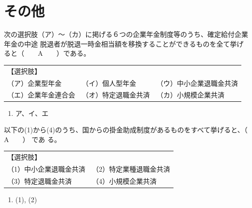 \section{その他}

\begin{fillblank}[年金1 2020 問題1(6)\textcircled{4}]
  次の選択肢（ア）～（カ）に掲げる６つの企業年金制度等のうち、確定給付企業年金の中途
脱退者が脱退一時金相当額を移換することができるものを全て挙げると（　　A　　）である。

\begin{table}[htbp]
  \centering
  \begin{tabular}{|lll|} \hline
    【選択肢】 & & \\ 
    （ア）企業型年金 & （イ）個人型年金 & （ウ）中小企業退職金共済 \\ 
    （エ）企業年金連合会 & （オ）特定退職金共済 & （カ）小規模企業共済 \\ \hline
  \end{tabular}
\end{table}
\end{fillblank}

\begin{answerbox}
  \begin{enumerate}[A: ]
    \item ア、イ、エ
  \end{enumerate}
\end{answerbox}

\begin{fillblank}[年金1 2024 問題1(6)エ]
  以下の(1)から(4)のうち、国からの掛金助成制度があるものをすべて挙げると、（　　A　　） であ
る。

\begin{table}[htbp]
  \centering
  \begin{tabular}{|ll|} \hline
    【選択肢】 &  \\ 
    （1）中小企業退職金共済 & （2）特定業種退職金共済  \\ 
    （3）特定退職金共済 & （4）小規模企業共済 \\ \hline
  \end{tabular}
\end{table}
\end{fillblank}


\begin{answerbox}
  \begin{enumerate}[A: ]
    \item (1), (2)
  \end{enumerate}
\end{answerbox}